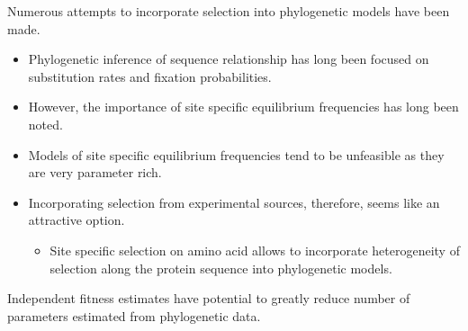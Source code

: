 \documentclass[12pt]{article}
\begin{document}
  Numerous attempts to incorporate selection into phylogenetic models have been made.
	\begin{itemize}
		\item Phylogenetic inference of sequence relationship has long been focused on substitution rates and fixation probabilities.
		\item However, the importance of site specific equilibrium frequencies has long been noted.
		\item Models of site specific equilibrium frequencies tend to be unfeasible as they are very parameter rich.
		\item Incorporating selection from experimental sources, therefore, seems like an attractive option.
		\begin{itemize}
			\item Site specific selection on amino acid allows to incorporate heterogeneity of selection along the protein sequence into phylogenetic models.
		\end{itemize}
	\end{itemize}
	\item Independent fitness estimates have potential to greatly reduce number of parameters estimated from phylogenetic data.
\end{document}
